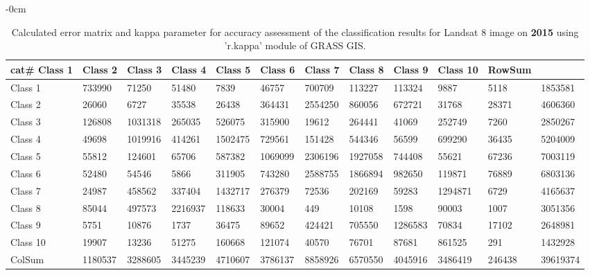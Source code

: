 \documentclass[analytics,article,submit,pdftex,moreauthors]{Definitions/mdpi}
\begin{document}
\begin{table}[H] 
\footnotesize
    \centering
    \begin{adjustwidth}{-\extralength}{0cm}
    \caption{Calculated error matrix and kappa parameter for accuracy assessment of the classification results for Landsat 8 image on \textbf{2015} using 'r.kappa' module of GRASS GIS.\label{tab03}}
 	\begin{tabularx}{\fulllength}{|l|l|l|l|l|l|l|l|l|l|l|l|}
    \toprule
        cat\# \textbf{Class 1} & \textbf{Class 2} & \textbf{Class 3} & \textbf{Class 4} & \textbf{Class 5} & \textbf{Class 6} & \textbf{Class 7} & \textbf{Class 8} & \textbf{Class 9} & \textbf{Class 10} & \textbf{RowSum} \\ \hline
        \midrule
        Class 1 & \cellcolor{green!10}733990 & 71250 & 51480 & 7839 & 46757 & 700709 & 113227 & 113324 & 9887 & 5118 & 1853581 \\ \hline
        Class 2 & 26060 & \cellcolor{green!10}6727 & 35538 & 26438 & 364431 & 2554250 & 860056 & 672721 & 31768 & 28371 & 4606360 \\ \hline
        Class 3 & 126808 & 1031318 & \cellcolor{green!10}265035 & 526075 & 315900 & 19612 & 264441 & 41069 & 252749 & 7260 & 2850267 \\ \hline
        Class 4 & 49698 & 1019916 & 414261 & \cellcolor{green!10}1502475 & 729561 & 151428 & 544346 & 56599 & 699290 & 36435 & 5204009 \\ \hline
        Class 5 & 55812 & 124601 & 65706 & 587382 & \cellcolor{green!10}1069099 & 2306196 & 1927058 & 744408 & 55621 & 67236 & 7003119 \\ \hline
        Class 6 & 52480 & 54546 & 5866 & 311905 & 743280 & \cellcolor{green!10}2588755 & 1866894 & 982650 & 119871 & 76889 & 6803136 \\ \hline
        Class 7 & 24987 & 458562 & 337404 & 1432717 & 276379 & 72536 & \cellcolor{green!10}202169 & 59283 & 1294871 & 6729 & 4165637 \\ \hline
        Class 8 & 85044 & 497573 & 2216937 & 118633 & 30004 & 449 & 10108 & \cellcolor{green!10}1598 & 90003 & 1007 & 3051356 \\ \hline
        Class 9 & 5751 & 10876 & 1737 & 36475 & 89652 & 424421 & 705550 & 1286583 & \cellcolor{green!10}70834 & 17102 & 2648981 \\ \hline
        Class 10 & 19907 & 13236 & 51275 & 160668 & 121074 & 40570 & 76701 & 87681 & 861525 & \cellcolor{green!10}291 & 1432928 \\ \hline
        ColSum & 1180537 & 3288605 & 3445239 & 4710607 & 3786137 & 8858926 & 6570550 & 4045916 & 3486419 & 246438 & \cellcolor{green!10}39619374 \\ \hline
        \bottomrule
    \end{tabularx}
    \end{adjustwidth}
\end{table}
\end{document}
